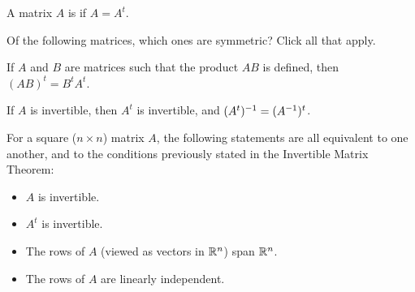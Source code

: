 \edXsolution{ 
 }

\endedxproblem




\endedxvertical



{} A matrix $A$ is {} if $A = A^t$.  

Of the following matrices, which ones are symmetric?  Click all that apply.  


\edXsolution{ 
 }

\endedxproblem


\endedxvertical





{}  If $A$ and $B$ are matrices such that the product $AB$ is defined, then 
$(AB)^t = B^t A^t$.  

{}  If $A$ is invertible, then $A^t$ is invertible, and $(A^t)^{-1} = (A^{-1})^t$.  

{}  For a square ($n\times n$) matrix $A$, the following statements are all
equivalent to one another, and to the conditions previously stated in the Invertible Matrix Theorem:
\begin{itemize}
\item $A$ is invertible.
\item $A^t$ is invertible.
\item The rows of $A$ (viewed as vectors in $\mathbb R^n$) span $\mathbb R^n$.  
\item The rows of $A$ are linearly independent.  
\end{itemize}

